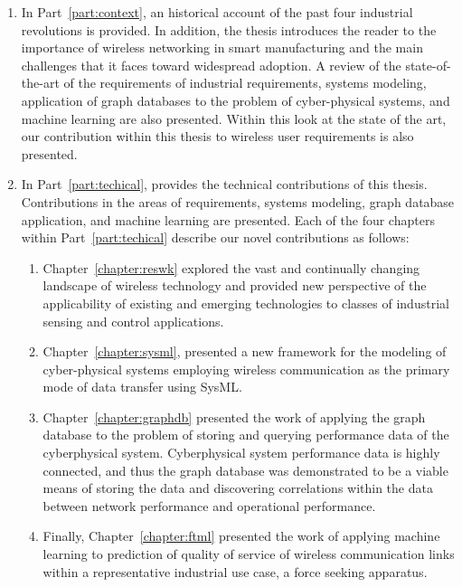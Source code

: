 \begin{enumerate}
	\item In Part~\ref{part:context}, an historical account of the past four industrial revolutions is provided.  In addition, the thesis introduces the reader to the importance of wireless networking in smart manufacturing and the main challenges that it faces toward widespread adoption. A review of the state-of-the-art of the requirements of industrial requirements, systems modeling, application of graph databases to the problem of cyber-physical systems, and machine learning are also presented.  Within this look at the state of the art, our contribution within this thesis to wireless user requirements is also presented.
	
	\item In Part~\ref{part:techical}, provides the technical contributions of this thesis. Contributions in the areas of requirements, systems modeling, graph database application, and machine learning are presented.  Each of the four chapters within Part~\ref{part:techical} describe our novel contributions as follows:
	\begin{enumerate}
		
		\item Chapter~\ref{chapter:reswk} explored the vast and continually changing landscape of wireless technology and provided new perspective of the applicability of existing and emerging technologies to classes of industrial sensing and control applications.
		
		\item Chapter~\ref{chapter:sysml}, presented a new framework for the modeling of cyber-physical systems employing wireless communication as the primary mode of data transfer using SysML.
		
		\item Chapter~\ref{chapter:graphdb} presented the work of applying the graph database to the problem of storing and querying performance data of the cyberphysical system.  Cyberphysical system performance data is highly connected, and thus the graph database was demonstrated to be a viable means of storing the data and discovering correlations within the data between network performance and operational performance.
		
		\item Finally, Chapter~\ref{chapter:ftml} presented the work of applying machine learning to prediction of quality of service of wireless communication links within a representative industrial use case, a force seeking apparatus.
	\end{enumerate}
\end{enumerate}




